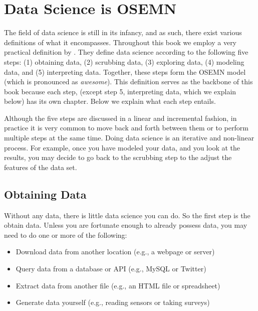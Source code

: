 \documentclass[
]{book}
\providecommand{\tightlist}{%
  \setlength{\itemsep}{0pt}\setlength{\parskip}{0pt}}
\theoremstyle{definition}
\theoremstyle{definition}
\theoremstyle{definition}
\theoremstyle{remark}
\begin{document}
\hypertarget{data-science-is-osemn}{%
\section{Data Science is OSEMN}\label{data-science-is-osemn}}

The field of data science is still in its infancy, and as such, there exist various definitions of what it encompasses. Throughout this book we employ a very practical definition by \citet{Mason2010}. They define data science according to the following five steps: (1) obtaining data, (2) scrubbing data, (3) exploring data, (4) modeling data, and (5) interpreting data. Together, these steps form the OSEMN model (which is pronounced as \emph{awesome}). This definition serves as the backbone of this book because each step, (except step 5, interpreting data, which we explain below) has its own chapter. Below we explain what each step entails.

\begin{rmdcomment}
Although the five steps are discussed in a linear and incremental fashion, in practice it is very common to move back and forth between them or to perform multiple steps at the same time. Doing data science is an iterative and non-linear process. For example, once you have modeled your data, and you look at the results, you may decide to go back to the scrubbing step to the adjust the features of the data set.
\end{rmdcomment}

\hypertarget{obtaining-data}{%
\subsection{Obtaining Data}\label{obtaining-data}}

Without any data, there is little data science you can do. So the first step is the obtain data. Unless you are fortunate enough to already possess data, you may need to do one or more of the following:

\begin{itemize}
\tightlist
\item
  Download data from another location (e.g., a webpage or server)
\item
  Query data from a database or API (e.g., MySQL or Twitter)
\item
  Extract data from another file (e.g., an HTML file or spreadsheet)
\item
  Generate data yourself (e.g., reading sensors or taking surveys)
\end{itemize}
\end{document}
